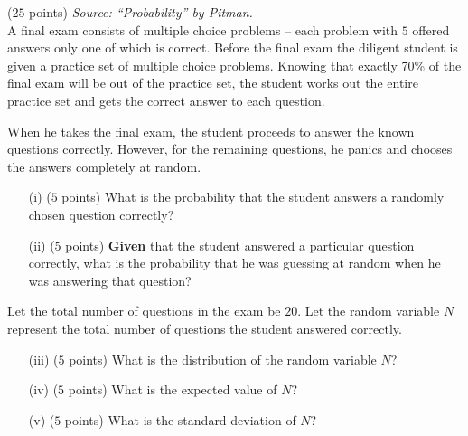 \documentclass[reqno,letterpaper, onsided,10pt]{amsart}
\theoremstyle{definition}
\begin{document}
\begin{problem} ($25$ points) %
  {\em Source: ``Probability'' by Pitman.}\\
  A final exam consists of multiple choice problems -- each problem
  with $5$ offered answers only one of which is correct.  Before the
  final exam the diligent student is given a practice set of multiple
  choice problems. Knowing that exactly 70\% of the final exam will be
  out of the practice set, the student works out the entire practice
  set and gets the correct answer to each question. 

When he takes the final exam, the student proceeds to answer the known
questions correctly. However, for the remaining questions, he panics
and chooses the answers completely at random. 

\begin{itemize}
\item[(i)] ($5$ points) What is the probability that the student
  answers a randomly chosen question correctly? 
\vskip4cm
\item[(ii)] ($5$ points) {\bf Given} that the student answered a
  particular question correctly, what is the probability that he
  was guessing at random when he was answering that question?
\vskip4cm
\end{itemize}

Let the total number of questions in the exam be $20$. Let the random
variable $N$ represent the total number of questions the student
answered correctly. 

\begin{itemize}
\item[(iii)] ($5$ points) What is the distribution of the random
  variable $N$? 
\vskip3cm
\item[(iv)] ($5$ points) What is the expected value of $N$?
\vskip4cm
\item[(v)] ($5$ points) What is the standard deviation of $N$?  
\end{itemize} 
\end{problem} 

\newpage
\end{document}
